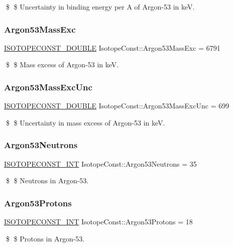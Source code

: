 \$ \$ Uncertainty in binding energy per A of Argon-\/53 in keV. \mbox{\label{group___isotope_const-_argon-_ar53_ga804895aba5e13ed4c72f7ad3f48777c6}} 
\subsubsection{\texorpdfstring{Argon53\+Mass\+Exc}{Argon53MassExc}}
{\footnotesize\ttfamily \mbox{\hyperlink{group___isotope_const-_macros_ga8f45a7272ce02c0b4c65c44636ed719a}{I\+S\+O\+T\+O\+P\+E\+C\+O\+N\+S\+T\+\_\+\+D\+O\+U\+B\+LE}} Isotope\+Const\+::\+Argon53\+Mass\+Exc = 6791}

\$ \$ Mass excess of Argon-\/53 in keV. \mbox{\label{group___isotope_const-_argon-_ar53_gadddbf8e1ace531c02cd779df04abf326}} 
\subsubsection{\texorpdfstring{Argon53\+Mass\+Exc\+Unc}{Argon53MassExcUnc}}
{\footnotesize\ttfamily \mbox{\hyperlink{group___isotope_const-_macros_ga8f45a7272ce02c0b4c65c44636ed719a}{I\+S\+O\+T\+O\+P\+E\+C\+O\+N\+S\+T\+\_\+\+D\+O\+U\+B\+LE}} Isotope\+Const\+::\+Argon53\+Mass\+Exc\+Unc = 699}

\$ \$ Uncertainty in mass excess of Argon-\/53 in keV. \mbox{\label{group___isotope_const-_argon-_ar53_gaa623166f80cd8488970163d0093ebc02}} 
\subsubsection{\texorpdfstring{Argon53\+Neutrons}{Argon53Neutrons}}
{\footnotesize\ttfamily \mbox{\hyperlink{group___isotope_const-_macros_ga5f18360b3e99483a35c32d789e62621c}{I\+S\+O\+T\+O\+P\+E\+C\+O\+N\+S\+T\+\_\+\+I\+NT}} Isotope\+Const\+::\+Argon53\+Neutrons = 35}

\$ \$ Neutrons in Argon-\/53. \mbox{\label{group___isotope_const-_argon-_ar53_ga0c80725661e7b7300859f6b27b1fd4a2}} 
\subsubsection{\texorpdfstring{Argon53\+Protons}{Argon53Protons}}
{\footnotesize\ttfamily \mbox{\hyperlink{group___isotope_const-_macros_ga5f18360b3e99483a35c32d789e62621c}{I\+S\+O\+T\+O\+P\+E\+C\+O\+N\+S\+T\+\_\+\+I\+NT}} Isotope\+Const\+::\+Argon53\+Protons = 18}

\$ \$ Protons in Argon-\/53. 